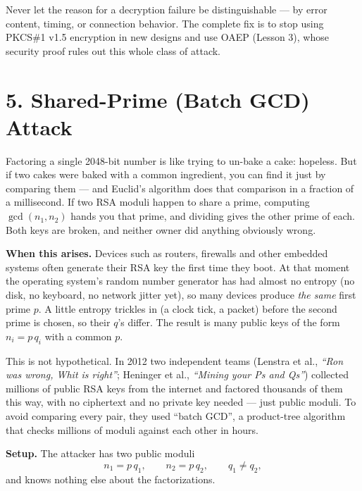 \documentclass[11pt]{article}
\begin{document}
\begin{fixbox}
Never let the reason for a decryption failure be distinguishable --- by error content, timing, or connection behavior. The complete fix is to stop using PKCS\#1 v1.5 encryption in new designs and use OAEP (Lesson 3), whose security proof rules out this whole class of attack.
\end{fixbox}

\hrulefill

\section*{5. Shared-Prime (Batch GCD) Attack}

\begin{intuition}
Factoring a single 2048-bit number is like trying to un-bake a cake: hopeless. But if two cakes were baked with a common ingredient, you can find it just by comparing them --- and Euclid's algorithm does that comparison in a fraction of a millisecond. If two RSA moduli happen to share a prime, computing $\gcd(n_1,n_2)$ hands you that prime, and dividing gives the other prime of each. Both keys are broken, and neither owner did anything obviously wrong.
\end{intuition}

\textbf{When this arises.} Devices such as routers, firewalls and other embedded systems often generate their RSA key the first time they boot. At that moment the operating system's random number generator has had almost no entropy (no disk, no keyboard, no network jitter yet), so many devices produce \emph{the same} first prime $p$. A little entropy trickles in (a clock tick, a packet) before the second prime is chosen, so their $q$'s differ. The result is many public keys of the form $n_i=p\,q_i$ with a common $p$.

This is not hypothetical. In 2012 two independent teams (Lenstra et al., \emph{``Ron was wrong, Whit is right''}; Heninger et al., \emph{``Mining your Ps and Qs''}) collected millions of public RSA keys from the internet and factored thousands of them this way, with no ciphertext and no private key needed --- just public moduli. To avoid comparing every pair, they used ``batch GCD'', a product-tree algorithm that checks millions of moduli against each other in hours.

\textbf{Setup.} The attacker has two public moduli
\[
n_1=p\,q_1,\qquad n_2=p\,q_2,\qquad q_1\ne q_2,
\]
and knows nothing else about the factorizations.
\end{document}
